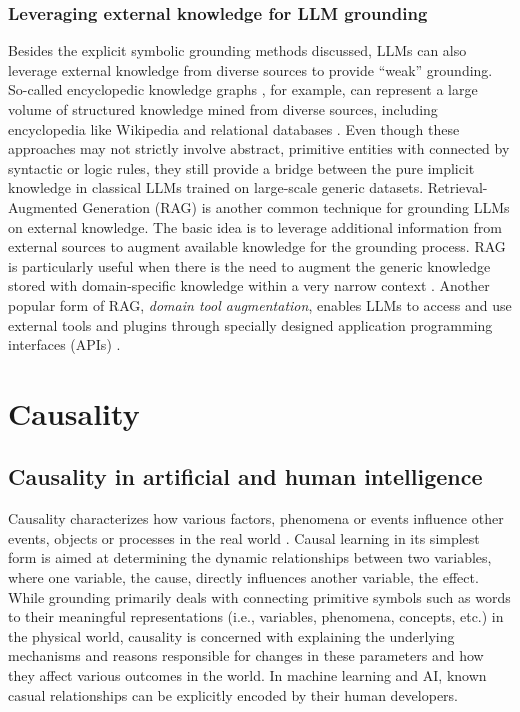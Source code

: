 \documentclass[10pt,journal,compsoc]{IEEEtran}
\begin{document}
	\subsubsection{Leveraging external knowledge for LLM grounding}
	Besides the explicit symbolic grounding methods discussed, LLMs can also leverage external knowledge from diverse sources to provide “weak” grounding. So-called encyclopedic knowledge graphs \cite{pan2024unifying}, for example,  can represent a large volume of structured knowledge mined from diverse sources, including encyclopedia like Wikipedia \cite{vrandevcic2014wikidata} and relational databases \cite{mahria2023building,sun2020model}. Even though these approaches may not strictly involve abstract, primitive entities with connected by syntactic or logic rules, they still provide a bridge between the pure implicit knowledge in classical LLMs trained on large-scale generic datasets. Retrieval-Augmented Generation  (RAG)\cite{lewis2020retrieval,zhao2024retrieval,gao2023retrieval} is another common technique for grounding LLMs on external knowledge. The basic idea is to leverage additional information from external sources to augment available knowledge for the grounding process. RAG is particularly useful when there is the need to augment the generic knowledge stored with domain-specific knowledge within a very narrow context \cite{zhang2024raft,wang2024domainrag}. Another popular form of RAG, \textit{domain tool augmentation}, enables LLMs to access and use external tools and plugins through specially designed application programming interfaces (APIs) \cite{parisi2022talm,qin2023toolllm,panda2024revolutionizing}. 
	
	
	
	\section{Causality}
	
	\subsection{Causality in artificial and human intelligence}
	Causality characterizes how various factors, phenomena or events influence other events, objects or processes in the real world \cite{scholkopf2022causality,pearl2009causality}. Causal learning in its simplest form is aimed at determining the dynamic relationships between two variables, where one variable, the cause, directly influences another variable, the effect. While grounding primarily deals with connecting primitive symbols such as words to their meaningful representations (i.e., variables, phenomena, concepts, etc.) in the physical world, causality is concerned with explaining the underlying mechanisms and reasons responsible for changes in these parameters and how they affect various outcomes in the world. In machine learning and AI, known casual relationships can be explicitly encoded by their human developers.
	
\end{document}
